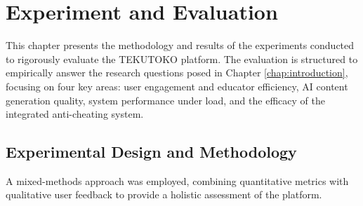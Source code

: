 \chapter{Experiment and Evaluation}
\label{chap:evaluation}

This chapter presents the methodology and results of the experiments conducted to rigorously evaluate the TEKUTOKO platform. The evaluation is structured to empirically answer the research questions posed in Chapter \ref{chap:introduction}, focusing on four key areas: user engagement and educator efficiency, AI content generation quality, system performance under load, and the efficacy of the integrated anti-cheating system.

\section{Experimental Design and Methodology}
\label{sec:eval-design}
A mixed-methods approach was employed, combining quantitative metrics with qualitative user feedback to provide a holistic assessment of the platform.

